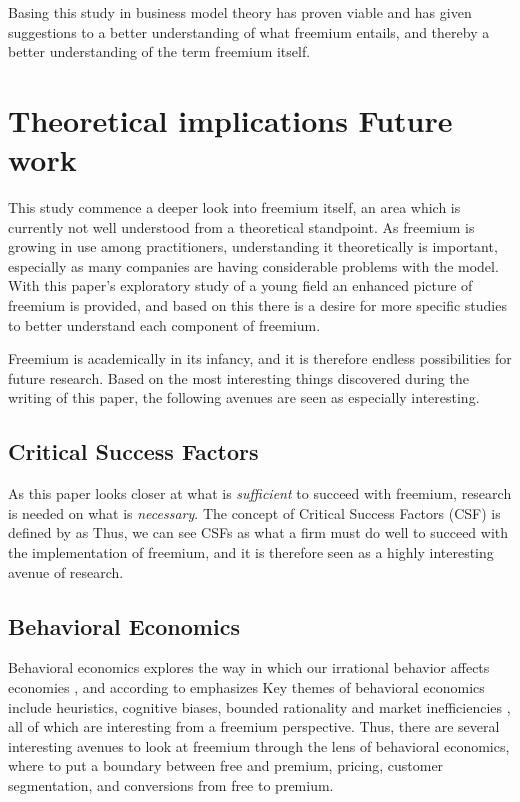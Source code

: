 Basing this study in business model theory has proven viable and has given suggestions to a better understanding of what freemium entails, and thereby a better understanding of the term freemium itself.

\section{Theoretical implications \oldand Future work}

This study commence a deeper look into freemium itself, an area which is currently not well understood from a theoretical standpoint. As freemium is growing in use among practitioners, understanding it theoretically is important, especially as many companies are having considerable problems with the model. With this paper's exploratory study of a young field an enhanced picture of freemium is provided, and based on this there is a desire for more specific studies to better understand each component of freemium. 

Freemium is academically in its infancy, and it is therefore endless possibilities for future research. Based on the most interesting things discovered during the writing of this paper, the following avenues are seen as especially interesting.

\subsection{Critical Success Factors}

As this paper looks closer at what is \emph{sufficient} to succeed with freemium, research is needed on what is \emph{necessary}. The concept of Critical Success Factors (CSF) is defined by \citet{boynton1984} as  Thus, we can see CSFs as what a firm must do well to succeed with the implementation \citep{weill2001} of freemium, and it is therefore seen as a highly interesting avenue of research.
   
\subsection{Behavioral Economics}

Behavioral economics explores the way in which our irrational behavior affects economies \citep{camerer2004}, and according to \citet[]{simon1997} emphasizes  Key themes of behavioral economics include heuristics, cognitive biases, bounded rationality and market inefficiencies \citep{simon1997}, all of which are interesting from a freemium perspective. Thus, there are several interesting avenues to look at freemium through the lens of behavioral economics, \eg where to put a boundary between free and premium, pricing, customer segmentation, and conversions from free to premium.
 
